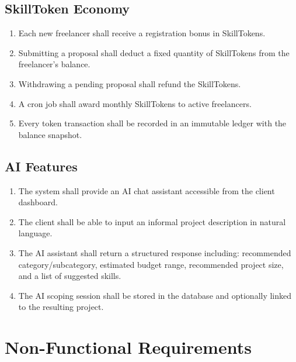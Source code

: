 \subsection{SkillToken Economy}

\begin{enumerate}[label=FR-TOKEN-\arabic*]
  \item Each new freelancer shall receive a registration bonus in SkillTokens.
  \item Submitting a proposal shall deduct a fixed quantity of SkillTokens from the freelancer's balance.
  \item Withdrawing a pending proposal shall refund the SkillTokens.
  \item A cron job shall award monthly SkillTokens to active freelancers.
  \item Every token transaction shall be recorded in an immutable ledger with the balance snapshot.
\end{enumerate}

\subsection{AI Features}

\begin{enumerate}[label=FR-AI-\arabic*]
  \item The system shall provide an AI chat assistant accessible from the client dashboard.
  \item The client shall be able to input an informal project description in natural language.
  \item The AI assistant shall return a structured response including: recommended category/subcategory, estimated budget range, recommended project size, and a list of suggested skills.
  \item The AI scoping session shall be stored in the database and optionally linked to the resulting project.
\end{enumerate}

\section{Non-Functional Requirements}

